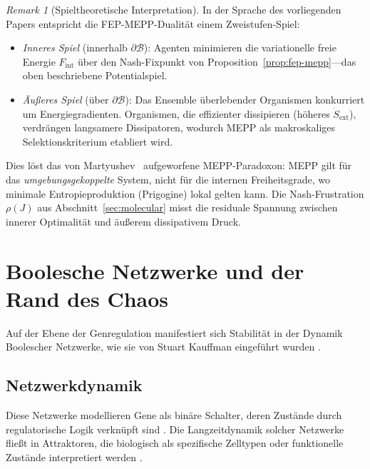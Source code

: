 \documentclass[12pt,a4paper]{article}
\theoremstyle{remark}
\newtheorem{remark}{Remark}
\begin{document}
\begin{remark}[Spieltheoretische Interpretation]
In der Sprache des vorliegenden Papers entspricht die FEP-MEPP-Dualit\"at einem Zweistufen-Spiel:
\begin{itemize}
  \item \emph{Inneres Spiel} (innerhalb $\partial\mathcal{B}$): Agenten minimieren die variationelle freie Energie $F_{\mathrm{int}}$ \"uber den Nash-Fixpunkt von Proposition~\ref{prop:fep-mepp}---das oben beschriebene Potentialspiel.
  \item \emph{\"Au\ss{}eres Spiel} (\"uber $\partial\mathcal{B}$): Das Ensemble \"uberlebender Organismen konkurriert um Energiegradienten. Organismen, die effizienter dissipieren (h\"oheres $\dot{S}_{\mathrm{ext}}$), verdrängen langsamere Dissipatoren, wodurch MEPP als makroskaliges Selektionskriterium etabliert wird.
\end{itemize}
Dies l\"ost das von Martyushev~\cite{Martyushev2010} aufgeworfene MEPP-Paradoxon: MEPP gilt f\"ur das \emph{umgebungsgekoppelte} System, nicht f\"ur die internen Freiheitsgrade, wo minimale Entropieproduktion (Prigogine) lokal gelten kann. Die Nash-Frustration $\rho(J)$ aus Abschnitt~\ref{sec:molecular} misst die residuale Spannung zwischen innerer Optimalit\"at und \"au\ss{}erem dissipativem Druck.
\end{remark}

\section{Boolesche Netzwerke und der Rand des Chaos}
\label{sec:boolean}

Auf der Ebene der Genregulation manifestiert sich Stabilit\"at in der Dynamik Boolescher Netzwerke, wie sie von Stuart Kauffman eingef\"uhrt wurden \citep{BooleanPost,KauffmanOrigins}.

\subsection{Netzwerkdynamik}

Diese Netzwerke modellieren Gene als bin\"are Schalter, deren Zust\"ande durch regulatorische Logik verkn\"upft sind \citep{BooleanPost}. Die Langzeitdynamik solcher Netzwerke flie\ss{}t in Attraktoren, die biologisch als spezifische Zelltypen oder funktionelle Zust\"ande interpretiert werden \citep{BooleanEvolution}.
\end{document}
